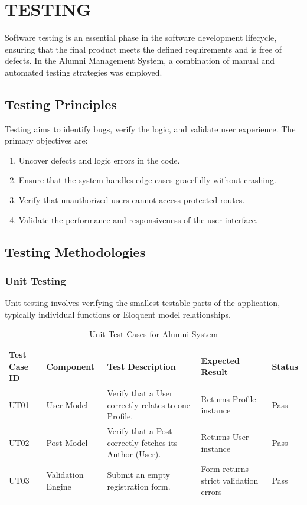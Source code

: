 \chapter{TESTING}

Software testing is an essential phase in the software development lifecycle, ensuring that the final product meets the defined requirements and is free of defects. In the Alumni Management System, a combination of manual and automated testing strategies was employed.

\section{Testing Principles}
Testing aims to identify bugs, verify the logic, and validate user experience. The primary objectives are:
\begin{enumerate}
    \item Uncover defects and logic errors in the code.
    \item Ensure that the system handles edge cases gracefully without crashing.
    \item Verify that unauthorized users cannot access protected routes.
    \item Validate the performance and responsiveness of the user interface.
\end{enumerate}

\section{Testing Methodologies}

\subsection{Unit Testing}
Unit testing involves verifying the smallest testable parts of the application, typically individual functions or Eloquent model relationships.

\begin{table}[H]
    \centering
    \small
    \begin{tabular}{|l|l|p{6cm}|p{5cm}|l|}
        \hline
        \textbf{Test Case ID} & \textbf{Component} & \textbf{Test Description} & \textbf{Expected Result} & \textbf{Status} \\
        \hline
        UT01 & User Model & Verify that a User correctly relates to one Profile. & Returns Profile instance & Pass \\
        \hline
        UT02 & Post Model & Verify that a Post correctly fetches its Author (User). & Returns User instance & Pass \\
        \hline
        UT03 & Validation Engine & Submit an empty registration form. & Form returns strict validation errors & Pass \\
        \hline
    \end{tabular}
    \caption{Unit Test Cases for Alumni System}
    \label{tab:unit_tests}
\end{table}

